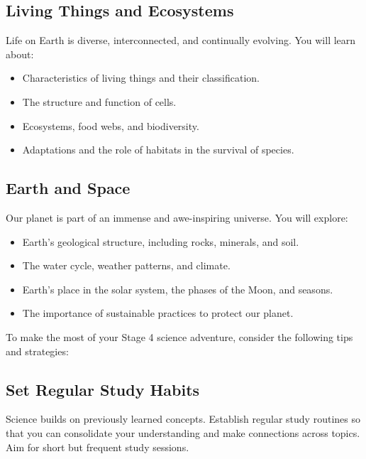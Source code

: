 \subsection{Living Things and Ecosystems}

Life on Earth is diverse, interconnected, and continually evolving. You will learn about:

\begin{itemize}
\item Characteristics of living things and their classification.
\item The structure and function of cells.
\item Ecosystems, food webs, and biodiversity.
\item Adaptations and the role of habitats in the survival of species.
\end{itemize}

\subsection{Earth and Space}

Our planet is part of an immense and awe-inspiring universe. You will explore:

\begin{itemize}
\item Earth's geological structure, including rocks, minerals, and soil.
\item The water cycle, weather patterns, and climate.
\item Earth's place in the solar system, the phases of the Moon, and seasons.
\item The importance of sustainable practices to protect our planet.
\end{itemize}

\FloatBarrier

\FloatBarrier

To make the most of your Stage 4 science adventure, consider the following tips and strategies:

\subsection{Set Regular Study Habits}

Science builds on previously learned concepts. Establish regular study routines so that you can consolidate your understanding and make connections across topics. Aim for short but frequent study sessions.

